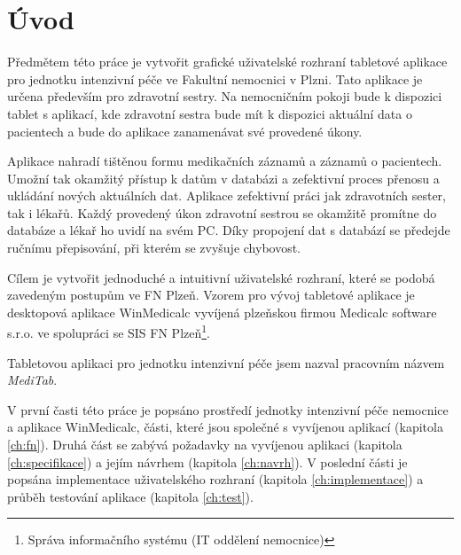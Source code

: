 \chapter*{Úvod}

Předmětem této práce je vytvořit grafické uživatelské rozhraní tabletové aplikace pro jednotku intenzivní péče ve Fakultní nemocnici v Plzni. Tato aplikace je určena především pro zdravotní sestry. Na nemocničním pokoji bude k dispozici tablet s aplikací, kde zdravotní sestra bude mít k dispozici aktuální data o pacientech a bude do aplikace zanamenávat své provedené úkony.

Aplikace nahradí tištěnou formu medikačních záznamů a záznamů o pacientech. Umožní tak okamžitý přístup k datům v databázi a zefektivní proces přenosu a ukládání nových aktuálních dat. Aplikace zefektivní práci jak zdravotních sester, tak i lékařů. Každý provedený úkon zdravotní sestrou se okamžitě promítne do databáze a lékař ho uvidí na svém PC. Díky propojení dat s databází se předejde ručnímu přepisování, při kterém se zvyšuje chybovost.

Cílem je vytvořit jednoduché a intuitivní uživatelské rozhraní, které se podobá zavedeným postupům ve FN Plzeň. Vzorem pro vývoj tabletové aplikace je desktopová aplikace WinMedicalc vyvíjená plzeňskou firmou Medicalc software s.r.o. ve spolupráci se SIS FN Plzeň\footnote{Správa informačního systému (IT oddělení nemocnice)}.

Tabletovou aplikaci pro jednotku intenzivní péče jsem nazval pracovním názvem \emph{MediTab}.

V první časti této práce je popsáno prostředí jednotky intenzivní péče nemocnice a aplikace WinMedicalc, části, které jsou společné s vyvíjenou aplikací (kapitola \ref{ch:fn}). Druhá část se zabývá požadavky na vyvíjenou aplikaci (kapitola \ref{ch:specifikace}) a jejím návrhem (kapitola \ref{ch:navrh}). V poslední části je popsána implementace uživatelského rozhraní (kapitola \ref{ch:implementace}) a průběh testování aplikace (kapitola \ref{ch:test}).